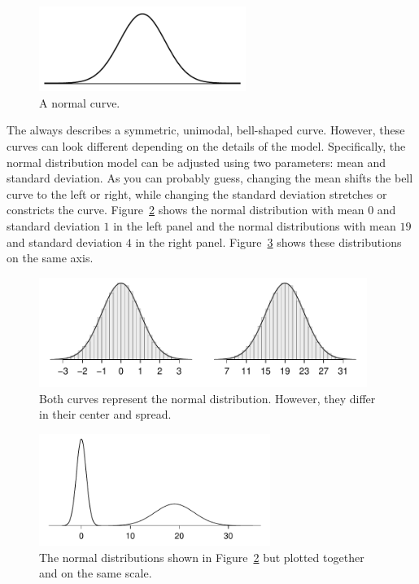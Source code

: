 \begin{figure}[h]
\centering
\includegraphics[width=0.6\textwidth]{ch_distributions/figures/simpleNormal/simpleNormal}
\caption{A normal curve.}
\label{simpleNormal}
\end{figure}

The  always describes a symmetric, unimodal, bell-shaped curve. However, these curves can look different depending on the details of the model. Specifically, the normal distribution model can be adjusted using two parameters: mean and standard deviation. As you can probably guess, changing the mean shifts the bell curve to the left or right, while changing the standard deviation stretches or constricts the curve. Figure~\ref{twoSampleNormals} shows the normal distribution with mean $0$ and standard deviation $1$ in the left panel and the normal distributions with mean $19$ and standard deviation $4$ in the right panel. Figure~\ref{twoSampleNormalsStacked} shows these distributions on the same axis.


\begin{figure}[hht]
\centering
\includegraphics[width=0.95\textwidth]{ch_distributions/figures/twoSampleNormals/twoSampleNormals}
\caption{Both curves represent the normal distribution.  However, they differ in their center and spread. }
\label{twoSampleNormals}
\end{figure}

\begin{figure}[hht]
\centering
\includegraphics[width=0.67\textwidth]{ch_distributions/figures/twoSampleNormalsStacked/twoSampleNormalsStacked}
\caption{The normal distributions shown in Figure~\ref{twoSampleNormals} but plotted together and on the same scale.}
\label{twoSampleNormalsStacked}
\end{figure}

